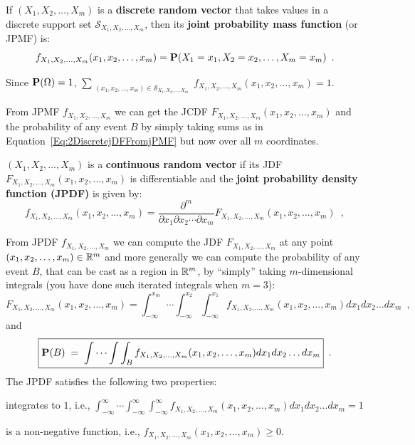 \begin{definition}
If $(X_1,X_2,\ldots,X_m)$ is a {\bf discrete random vector} that takes values in a discrete support set $\mathcal{S}_{X_1,X_2,\ldots,X_m}$, then its \textbf{joint probability mass function} (or JPMF) is:
\begin{equation}\label{Eq:jmDPMF}
f_{X_1,X_2,\ldots,X_m}(x_1,x_2,\ldots,x_m) = \mathbf{P}(X_1=x_1,X_2=x_2,\ldots,X_m=x_m) \enspace . 
\end{equation}
\end{definition}
Since $\mathbf{P}(\Omega)=1$, $\sum_{{\substack{(x_1,x_2,\ldots,x_m) \in \mathcal{S}_{X_1,X_2,\ldots,X_m}}}}f_{X_1,X_2,\ldots,X_m}(x_1,x_2,\ldots,x_m)=1$.

From JPMF $f_{X_1,X_2,\ldots,X_m}$ we can get the JCDF $F_{X_1,X_2,\ldots,X_m}(x_1,x_2,\ldots,x_m)$ and the probability of any event $B$ by simply taking sums as in Equation~\eqref{Eq:2DiscretejDFFromjPMF} but now over all $m$ coordinates.

\begin{definition}
$(X_1,X_2,\ldots,X_m)$ is a {\bf continuous random vector} if its JDF $F_{X_1,X_2,\ldots,X_m}(x_1,x_2,\ldots,x_m)$ is differentiable and the {\bf joint probability density function (JPDF)} is given by:
\[
f_{X_1,X_2,\ldots,X_m}(x_1,x_2,\ldots,x_m) = \frac{\partial^m}{\partial x_1 \partial x_2 \cdots \partial x_m} F_{X_1,X_2,\ldots,X_m}(x_1,x_2,\ldots,x_m) \enspace ,
\]
\end{definition}

From JPDF $f_{X_1,X_2,\ldots,X_m}$ we can compute the JDF $F_{X_1,X_2,\ldots,X_m}$ at any point $(x_1,x_2,\ldots,x_m) \in \mathbb{R}^m$ and more generally we can compute the probability of any event $B$, that can be cast as a region in $\mathbb{R}^m$, by ``simply'' taking $m$-dimensional integrals (you have done such iterated integrals when $m=3$):
\begin{equation}\label{Eq:mContjDFFromjPDF}
\boxed{F_{X_1,X_2,\ldots,X_m}(x_1,x_2,\ldots,x_m) = \int_{-\infty}^{x_m} \cdots \int_{-\infty}^{x_2} \int_{-\infty}^{x_1} f_{X_1,X_2,\ldots,X_m}(x_1,x_2,\ldots,x_m) dx_1 dx_2\ldots d x_m}\enspace ,
\end{equation}
and
\begin{equation}\label{Eq:mContProbEventFromjPDF}
\boxed{\mathbf{P}(B)\;=\; \int\cdots\int\int_{B} f_{X_1,X_2,\ldots,X_m}(x_1,x_2,\ldots,x_m) dx_1 dx_2\ldots d x_m}\enspace .
\end{equation}
The JPDF satisfies the following two properties:
\be
\item integrates to $1$, i.e., $\int_{-\infty}^{\infty} \cdots \int_{-\infty}^{\infty}\int_{-\infty}^{\infty} f_{X_1,X_2,\ldots,X_m}(x_1,x_2,\ldots,x_m) dx_1 dx_2\ldots d x_m=1$
\item is a non-negative function, i.e., $f_{X_1,X_2,\ldots,X_m}(x_1,x_2,\ldots,x_m) \geq 0$.
\ee

